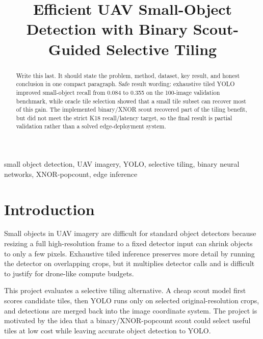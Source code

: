 \documentclass[conference]{IEEEtran}
\begin{document}
\title{Efficient UAV Small-Object Detection with Binary Scout-Guided Selective Tiling}

\author{
}

\maketitle

\begin{abstract}
Write this last. It should state the problem, method, dataset, key result, and honest conclusion in one compact paragraph. Safe result wording: exhaustive tiled YOLO improved small-object recall from 0.084 to 0.355 on the 100-image validation benchmark, while oracle tile selection showed that a small tile subset can recover most of this gain. The implemented binary/XNOR scout recovered part of the tiling benefit, but did not meet the strict K18 recall/latency target, so the final result is partial validation rather than a solved edge-deployment system.
\end{abstract}

\begin{IEEEkeywords}
small object detection, UAV imagery, YOLO, selective tiling, binary neural networks, XNOR-popcount, edge inference
\end{IEEEkeywords}

\section{Introduction}
Small objects in UAV imagery are difficult for standard object detectors because resizing a full high-resolution frame to a fixed detector input can shrink objects to only a few pixels. Exhaustive tiled inference preserves more detail by running the detector on overlapping crops, but it multiplies detector calls and is difficult to justify for drone-like compute budgets.

This project evaluates a selective tiling alternative. A cheap scout model first scores candidate tiles, then YOLO runs only on selected original-resolution crops, and detections are merged back into the image coordinate system. The project is motivated by the idea that a binary/XNOR-popcount scout could select useful tiles at low cost while leaving accurate object detection to YOLO.
\end{document}
